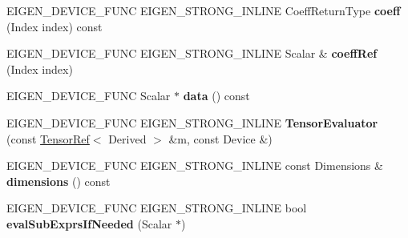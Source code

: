 \begin{DoxyCompactItemize}
E\+I\+G\+E\+N\+\_\+\+D\+E\+V\+I\+C\+E\+\_\+\+F\+U\+NC E\+I\+G\+E\+N\+\_\+\+S\+T\+R\+O\+N\+G\+\_\+\+I\+N\+L\+I\+NE Coeff\+Return\+Type {\bfseries coeff} (Index index) const
\item 
\mbox{\label{struct_eigen_1_1_tensor_evaluator_3_01const_01_tensor_ref_3_01_derived_01_4_00_01_device_01_4_a3a3e17ef6adcd5bc3f02a2ccd02d4dfe}} 
E\+I\+G\+E\+N\+\_\+\+D\+E\+V\+I\+C\+E\+\_\+\+F\+U\+NC E\+I\+G\+E\+N\+\_\+\+S\+T\+R\+O\+N\+G\+\_\+\+I\+N\+L\+I\+NE Scalar \& {\bfseries coeff\+Ref} (Index index)
\item 
\mbox{\label{struct_eigen_1_1_tensor_evaluator_3_01const_01_tensor_ref_3_01_derived_01_4_00_01_device_01_4_aa0c4a9617a7dc87d1898107d36c6b7ea}} 
E\+I\+G\+E\+N\+\_\+\+D\+E\+V\+I\+C\+E\+\_\+\+F\+U\+NC Scalar $\ast$ {\bfseries data} () const
\item 
\mbox{\label{struct_eigen_1_1_tensor_evaluator_3_01const_01_tensor_ref_3_01_derived_01_4_00_01_device_01_4_a26e1315e9986cf87e8f70c213a20ba53}} 
E\+I\+G\+E\+N\+\_\+\+D\+E\+V\+I\+C\+E\+\_\+\+F\+U\+NC E\+I\+G\+E\+N\+\_\+\+S\+T\+R\+O\+N\+G\+\_\+\+I\+N\+L\+I\+NE {\bfseries Tensor\+Evaluator} (const \hyperlink{class_eigen_1_1_tensor_ref}{Tensor\+Ref}$<$ Derived $>$ \&m, const Device \&)
\item 
\mbox{\label{struct_eigen_1_1_tensor_evaluator_3_01const_01_tensor_ref_3_01_derived_01_4_00_01_device_01_4_a9ef51ea99b50bafe25c0e9b74f6a347f}} 
E\+I\+G\+E\+N\+\_\+\+D\+E\+V\+I\+C\+E\+\_\+\+F\+U\+NC E\+I\+G\+E\+N\+\_\+\+S\+T\+R\+O\+N\+G\+\_\+\+I\+N\+L\+I\+NE const Dimensions \& {\bfseries dimensions} () const
\item 
\mbox{\label{struct_eigen_1_1_tensor_evaluator_3_01const_01_tensor_ref_3_01_derived_01_4_00_01_device_01_4_afe6280141118e1a9314fc206ee92756e}} 
E\+I\+G\+E\+N\+\_\+\+D\+E\+V\+I\+C\+E\+\_\+\+F\+U\+NC E\+I\+G\+E\+N\+\_\+\+S\+T\+R\+O\+N\+G\+\_\+\+I\+N\+L\+I\+NE bool {\bfseries eval\+Sub\+Exprs\+If\+Needed} (Scalar $\ast$)

\end{DoxyCompactItemize}
